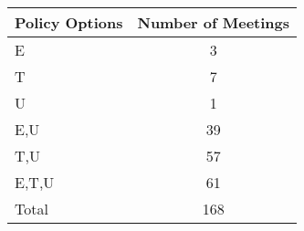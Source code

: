 \begin{tabular}{lc}
\hline\hline 
\addlinespace 
Policy Options & Number of Meetings \\ 
\hline 
E & 3 \\
T & 7 \\
U & 1 \\
E,U & 39 \\
T,U & 57 \\
E,T,U & 61 \\
\addlinespace 
Total & 168 \\
\hline 
\end{tabular}